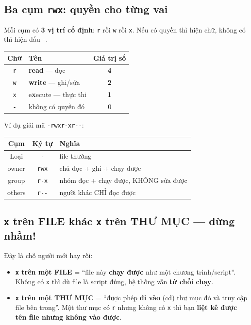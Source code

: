\documentclass[12pt,a4paper]{article}
\newcommand{\cmd}[1]{\texttt{#1}}
\begin{document}
\subsection{Ba cụm \texttt{rwx}: quyền cho từng vai}

Mỗi cụm có \textbf{3 vị trí cố định}: \cmd{r} rồi \cmd{w} rồi \cmd{x}. Nếu có quyền
thì hiện chữ, không có thì hiện dấu \cmd{-}.

\begin{center}
\begin{tabular}{|c|>{\raggedright\arraybackslash}p{6cm}|c|}
\hline
\rowcolor{tablehead}\textbf{Chữ} & \textbf{Tên} & \textbf{Giá trị số} \\
\hline
\cmd{r} & \textbf{read} --- đọc & \textbf{4} \\
\hline
\cmd{w} & \textbf{write} --- ghi/sửa & \textbf{2} \\
\hline
\cmd{x} & e\textbf{x}ecute --- thực thi & \textbf{1} \\
\hline
\cmd{-} & không có quyền đó & 0 \\
\hline
\end{tabular}
\end{center}

Ví dụ giải mã \cmd{-rwxr-xr-{}-}:

\begin{center}
\begin{tabular}{|c|c|>{\raggedright\arraybackslash}p{7cm}|}
\hline
\rowcolor{tablehead}\textbf{Cụm} & \textbf{Ký tự} & \textbf{Nghĩa} \\
\hline
Loại & \cmd{-} & file thường \\
\hline
owner & \cmd{rwx} & chủ đọc + ghi + chạy được \\
\hline
group & \cmd{r-x} & nhóm đọc + chạy được, KHÔNG sửa được \\
\hline
others & \cmd{r-{}-} & người khác CHỈ đọc được \\
\hline
\end{tabular}
\end{center}

\subsection{\texttt{x} trên FILE khác \texttt{x} trên THƯ MỤC --- đừng nhầm!}

Đây là chỗ người mới hay rối:

\begin{itemize}
\item \textbf{\cmd{x} trên một FILE} = ``file này \textbf{chạy được} như một
  chương trình/script''. Không có \cmd{x} thì dù file là script đúng, hệ thống vẫn
  \textbf{từ chối chạy}.
\item \textbf{\cmd{x} trên một THƯ MỤC} = ``được phép \textbf{đi vào} (cd) thư mục đó
  và truy cập file bên trong''. Một thư mục có \cmd{r} nhưng không có \cmd{x} thì bạn
  \textbf{liệt kê được tên file nhưng không vào được}.
\end{itemize}
\end{document}
